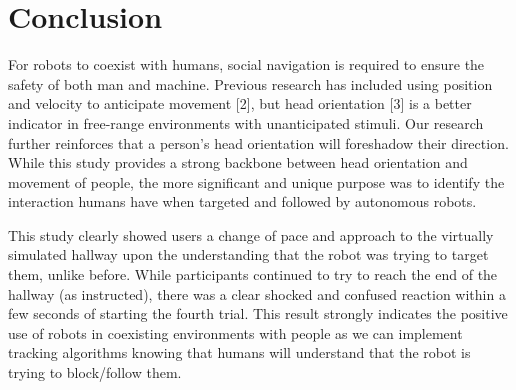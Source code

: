 \documentclass[letterpaper, 10 pt, conference]{ieeeconf}
\begin{document}
\section{Conclusion}

For robots to coexist with humans, social navigation is required to ensure the safety of both man and machine. Previous research has included using position and velocity to anticipate movement [2], but head orientation [3] is a better indicator in free-range environments with unanticipated stimuli. Our research further reinforces that a person's head orientation will foreshadow their direction. While this study provides a strong backbone between head orientation and movement of people, the more significant and unique purpose was to identify the interaction humans have when targeted and followed by autonomous robots. 

This study clearly showed users a change of pace and approach to the virtually simulated hallway upon the understanding that the robot was trying to target them, unlike before. While participants continued to try to reach the end of the hallway (as instructed), there was a clear shocked and confused reaction within a few seconds of starting the fourth trial. This result strongly indicates the positive use of robots in coexisting environments with people as we can implement tracking algorithms knowing that humans will understand that the robot is trying to block/follow them. 

\end{document}
